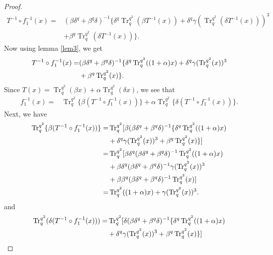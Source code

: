 \documentclass{birkjour}
\theoremstyle{definition}
\theoremstyle{remark}
\numberwithin{equation}{section}
\begin{document}
\begin{proof}
\begin{align*}
	T^{-1}\circ f_1^{-1}(x)=&(\beta\delta^{q}+\beta^{q}\delta)^{-1}\{\delta^{q}\operatorname{Tr}_{q}^{q^2}(\beta T^{-1}(x))+\delta^{q}\gamma(\operatorname{Tr}_{q}^{q^2}(\delta T^{-1}(x)))^3\\&+\beta^{q}\operatorname{Tr}_{q}^{q^2}(\delta T^{-1}(x))\}.
   \end{align*}
   Now using lemma \ref{lem3}, we get
   \begin{align}
   	T^{-1}\circ f_1^{-1}(x)=&(\beta\delta^{q}+\beta^{q}\delta)^{-1}\{\delta^{q}\operatorname{Tr}_{q}^{q^2}((1+\alpha)x)+\delta^{q}\gamma(\operatorname{Tr}_{q}^{q^2}(x))^3
   	\notag\\&+\beta^{q}\operatorname{Tr}_{q}^{q^2}(x)\}.
   \end{align}
   Since $T(x)= \operatorname{Tr}_q^{q^2}(\beta x)+\alpha\operatorname{Tr}_q^{q^2}(\delta x)$, we see that
   \begin{align}
   	f_1^{-1}(x)=&\operatorname{Tr}_{q}^{q^2}\{\beta (T^{-1}\circ f_1^{-1}(x))\}+\alpha\operatorname{Tr}_{q}^{q^2}\{\delta (T^{-1}\circ f_1^{-1}(x))\}.\label{c}
   \end{align}
   Next, we have
   \begin{align}
   	\operatorname{Tr}_{q}^{q^2}\{\beta (T^{-1}\circ f_1^{-1}(x))\}=&\operatorname{Tr}_{q}^{q^2}[\beta (\beta\delta^{q}+\beta^{q}\delta)^{-1}\{\delta^{q}\operatorname{Tr}_{q}^{q^2}((1+\alpha)x)\notag\\&+\delta^{q}\gamma(\operatorname{Tr}_{q}^{q^2}(x))^3+\beta^{q}\operatorname{Tr}_{q}^{q^2}(x)\}]\notag\\
   	=&\operatorname{Tr}_{q}^{q^2}[\beta\delta^{q}(\beta\delta^{q}+\beta^{q}\delta)^{-1}\operatorname{Tr}_{q}^{q^2}((1+\alpha)x)\notag\\&+\beta\delta^{q}(\beta\delta^{q}+\beta^{q}\delta)^{-1}\gamma(\operatorname{Tr}_{q}^{q^2}(x))^3\notag\\&+\beta\beta^{q}(\beta\delta^{q}+\beta^{q}\delta)^{-1}\operatorname{Tr}_{q}^{q^2}(x)]\notag\\
   	=&\operatorname{Tr}_{q}^{q^2}((1+\alpha)x)+\gamma(\operatorname{Tr}_{q}^{q^2}(x))^3\label{d}.
   \end{align}
   and
   \begin{align}
   	\operatorname{Tr}_{q}^{q^2}(\delta (T^{-1}\circ f_1^{-1}(x)))=&\operatorname{Tr}_{q}^{q^2}[\delta (\beta\delta^{q}+\beta^{q}\delta)^{-1}\{\delta^{q}\operatorname{Tr}_{q}^{q^2}((1+\alpha)x)\notag\\&+\delta^{q}\gamma(\operatorname{Tr}_{q}^{q^2}(x))^3+\beta^{q}\operatorname{Tr}_{q}^{q^2}(x)\}]\notag\\

\end{align}
\end{proof}
\end{document}
